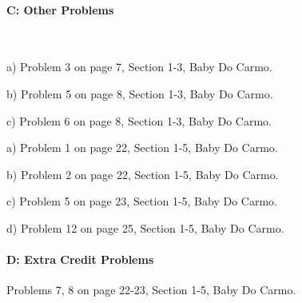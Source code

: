 \documentclass[12pt]{article}
\begin{document}
\paragraph{C: Other Problems}

\

\begin{itemize}
{\item a) Problem 3 on page 7, Section 1-3, Baby Do Carmo.}
{\item b) Problem 5 on page 8, Section 1-3, Baby Do Carmo.}
{\item c) Problem 6 on page 8, Section 1-3, Baby Do Carmo.}
\end{itemize}


\begin{itemize}
{\item a) Problem 1 on page 22, Section 1-5, Baby Do Carmo.}
{\item b) Problem 2 on page 22, Section 1-5, Baby Do Carmo.}
{\item c) Problem 5 on page 23, Section 1-5, Baby Do Carmo.}
{\item d) Problem 12 on page 25, Section 1-5, Baby Do Carmo.}
\end{itemize}

\paragraph{D: Extra Credit Problems}
\begin{itemize}
{\item Problems 7, 8  on page 22-23, Section 1-5, Baby Do Carmo.}
\end{itemize}
\end{document}
